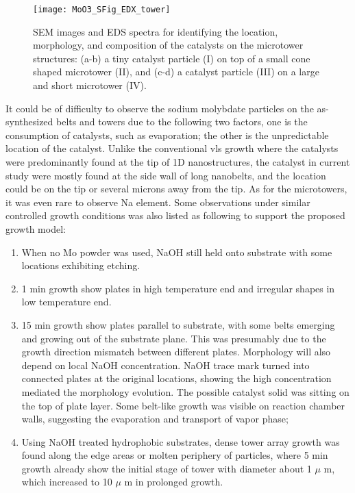 \begin{figure}[htb]
\centering
\texttt{[image: MoO3\_SFig\_EDX\_tower]}
\caption[SEM images and EDS spectra for identifying the location, morphology, and composition of the catalysts on the microtower structures]{SEM images and EDS spectra for identifying the location, morphology, and composition of the catalysts on the microtower structures: (a-b) a tiny catalyst particle (I) on top of a small cone shaped microtower (II), and (c-d) a catalyst particle (III) on a large and short microtower (IV).}
\label{fig:ch4edx2}
\end{figure}
It could be of difficulty to observe the sodium molybdate particles on the as-synthesized belts and towers due to the following two factors, one is the consumption of catalysts, such as evaporation; the other is the unpredictable location of the catalyst. Unlike the conventional \gls{vls} growth where the catalysts were predominantly found at the tip of 1D nanostructures, the catalyst in current study were mostly found at the side wall of long nanobelts, and the location could be on the tip or several microns away from the tip. As for the microtowers, it was even rare to observe Na element. Some observations under similar controlled growth conditions was also listed as following to support the proposed growth model: 
\begin{enumerate}
\item When no Mo powder was used, NaOH still held onto substrate with some locations exhibiting etching.
\item 1 min growth show plates in high temperature end and irregular shapes in low temperature end.
\item 15 min growth show  plates parallel to substrate, with some belts emerging and growing out of the substrate plane. This was presumably due to the growth direction mismatch between different plates. Morphology will also depend on local NaOH concentration. NaOH trace mark turned into connected plates at the original locations, showing the high concentration mediated the morphology evolution. The possible catalyst solid was sitting on the top of plate layer. Some belt-like growth was visible on reaction chamber walls, suggesting the evaporation and transport of  vapor phase;
\item Using NaOH treated hydrophobic substrates, dense tower array growth was found along the edge areas or molten periphery of particles, where 5 min growth already show the initial stage of tower with diameter about 1 $\mu$ m, which increased to 10 $\mu$ m in prolonged growth.
\end{enumerate}

